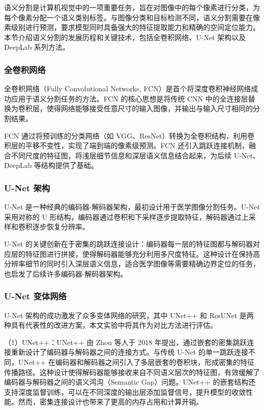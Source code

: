 语义分割是计算机视觉中的一项重要任务，旨在对图像中的每个像素进行分类，为每个像素分配一个语义类别标签。与图像分类和目标检测不同，语义分割需要在像素级别进行预测，要求模型同时具备强大的特征提取能力和精确的空间定位能力。本节介绍语义分割的发展历程和关键技术，包括全卷积网络、U-Net 架构以及 DeepLab 系列方法。

\subsubsection{全卷积网络}

全卷积网络（Fully Convolutional Networks, FCN）是首个将深度卷积神经网络成功应用于语义分割任务的方法。FCN 的核心思想是将传统 CNN 中的全连接层替换为卷积层，使得网络能够接受任意尺寸的输入图像，并输出与输入尺寸相同的分割结果。

FCN 通过将预训练的分类网络（如 VGG、ResNet）转换为全卷积结构，利用卷积层的平移不变性，实现了端到端的像素级预测。FCN 还引入跳跃连接机制，融合不同尺度的特征图，将浅层细节信息和深层语义信息结合起来，为后续 U-Net、DeepLab 等结构提供了基础。

\subsubsection{U-Net 架构}

U-Net 是一种经典的编码器-解码器架构，最初设计用于医学图像分割任务。U-Net 采用对称的 U 形结构，编码器通过卷积和下采样逐步提取特征，解码器通过上采样和卷积逐步恢复分辨率。

U-Net 的关键创新在于密集的跳跃连接设计：编码器每一层的特征图都与解码器对应层的特征图进行拼接，使得解码器能够充分利用多尺度特征。这种设计在保持高分辨率细节的同时引入深层语义信息，适合医学图像等需要精确边界定位的任务，也启发了后续许多编码器-解码器架构。

\subsubsection{U-Net 变体网络}

U-Net 架构的成功激发了众多变体网络的研究，其中 UNet++ 和 ResUNet 是两种具有代表性的改进方案，本文实验中将其作为对比方法进行评估。

（1）UNet++：UNet++ 由 Zhou 等人于 2018 年提出，通过嵌套的密集跳跃连接重新设计了编码器与解码器之间的连接方式。与传统 U-Net 的单一跳跃连接不同，UNet++ 在编码器和解码器之间引入了多层嵌套的卷积块，形成密集的特征传播路径。这种设计使得解码器能够接收来自不同语义层次的特征图，有效缓解了编码器与解码器之间的语义鸿沟（Semantic Gap）问题。UNet++ 的嵌套结构还支持深度监督训练，可以在不同深度的输出层添加监督信号，提升模型的收敛性能。然而，密集连接设计也带来了更高的内存占用和计算开销。

